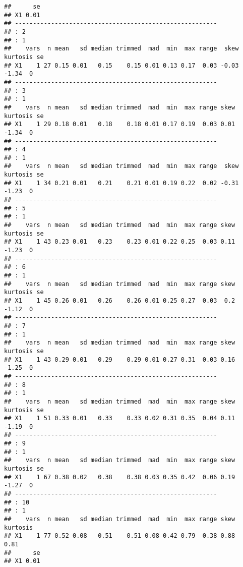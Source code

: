 \documentclass[10pt,]{book}
\begin{document}
\begin{verbatim}
##      se
## X1 0.01
## -------------------------------------------------------- 
## : 2
## : 1
##    vars  n mean   sd median trimmed  mad  min  max range  skew kurtosis se
## X1    1 27 0.15 0.01   0.15    0.15 0.01 0.13 0.17  0.03 -0.03    -1.34  0
## -------------------------------------------------------- 
## : 3
## : 1
##    vars  n mean   sd median trimmed  mad  min  max range skew kurtosis se
## X1    1 29 0.18 0.01   0.18    0.18 0.01 0.17 0.19  0.03 0.01    -1.34  0
## -------------------------------------------------------- 
## : 4
## : 1
##    vars  n mean   sd median trimmed  mad  min  max range  skew kurtosis se
## X1    1 34 0.21 0.01   0.21    0.21 0.01 0.19 0.22  0.02 -0.31    -1.23  0
## -------------------------------------------------------- 
## : 5
## : 1
##    vars  n mean   sd median trimmed  mad  min  max range skew kurtosis se
## X1    1 43 0.23 0.01   0.23    0.23 0.01 0.22 0.25  0.03 0.11    -1.23  0
## -------------------------------------------------------- 
## : 6
## : 1
##    vars  n mean   sd median trimmed  mad  min  max range skew kurtosis se
## X1    1 45 0.26 0.01   0.26    0.26 0.01 0.25 0.27  0.03  0.2    -1.12  0
## -------------------------------------------------------- 
## : 7
## : 1
##    vars  n mean   sd median trimmed  mad  min  max range skew kurtosis se
## X1    1 43 0.29 0.01   0.29    0.29 0.01 0.27 0.31  0.03 0.16    -1.25  0
## -------------------------------------------------------- 
## : 8
## : 1
##    vars  n mean   sd median trimmed  mad  min  max range skew kurtosis se
## X1    1 51 0.33 0.01   0.33    0.33 0.02 0.31 0.35  0.04 0.11    -1.19  0
## -------------------------------------------------------- 
## : 9
## : 1
##    vars  n mean   sd median trimmed  mad  min  max range skew kurtosis se
## X1    1 67 0.38 0.02   0.38    0.38 0.03 0.35 0.42  0.06 0.19    -1.27  0
## -------------------------------------------------------- 
## : 10
## : 1
##    vars  n mean   sd median trimmed  mad  min  max range skew kurtosis
## X1    1 77 0.52 0.08   0.51    0.51 0.08 0.42 0.79  0.38 0.88     0.81
##      se
## X1 0.01
\end{verbatim}
\end{document}
